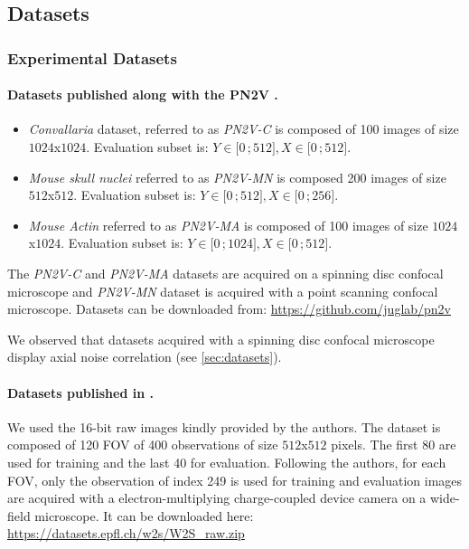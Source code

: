 \documentclass{article}
\newcommand{\interval}[2]{\mathopen{[}#1\,;#2\mathclose{]}}
\begin{document}
\subsection{Datasets}
\subsubsection{Experimental Datasets}
\label{si:datasetxp}
\paragraph{Datasets published along with the PN2V \cite{krull2019probabilistic}.}
\begin{itemize}
  \item \emph{Convallaria} dataset, referred to as \emph{PN2V-C} is composed of 100 images of size $1024$x$1024$. Evaluation subset is: $Y\in\interval{0}{512}, X\in\interval{0}{512}$.
  \item \emph{Mouse skull nuclei} referred to as \emph{PN2V-MN} is composed 200 images of size $512$x$512$. Evaluation subset is: $Y\in\interval{0}{512}, X\in\interval{0}{256}$.
  \item \emph{Mouse Actin} referred to as \emph{PN2V-MA} is composed of 100 images of size $1024$x$1024$. Evaluation subset is: $Y\in\interval{0}{1024}, X\in\interval{0}{512}$.
\end{itemize}

The \emph{PN2V-C} and \emph{PN2V-MA} datasets are acquired on a spinning disc confocal microscope and \emph{PN2V-MN} dataset is acquired with a point scanning confocal microscope.
Datasets can be downloaded from: \url{https://github.com/juglab/pn2v}

We observed that datasets acquired with a spinning disc confocal microscope display axial noise correlation (see \ref{sec:datasets}).

\paragraph{Datasets published in \cite{zhou2020w2s}.}

We used the 16-bit raw images kindly provided by the authors.
The dataset is composed of 120 FOV of 400 observations of size $512$x$512$ pixels.
The first 80 are used for training and the last 40 for evaluation.
Following the authors, for each FOV, only the observation of index 249 is used for training and evaluation
images are acquired with a electron-multiplying charge-coupled device camera on a wide-field microscope.
It can be downloaded here: \url{https://datasets.epfl.ch/w2s/W2S_raw.zip}
\end{document}
